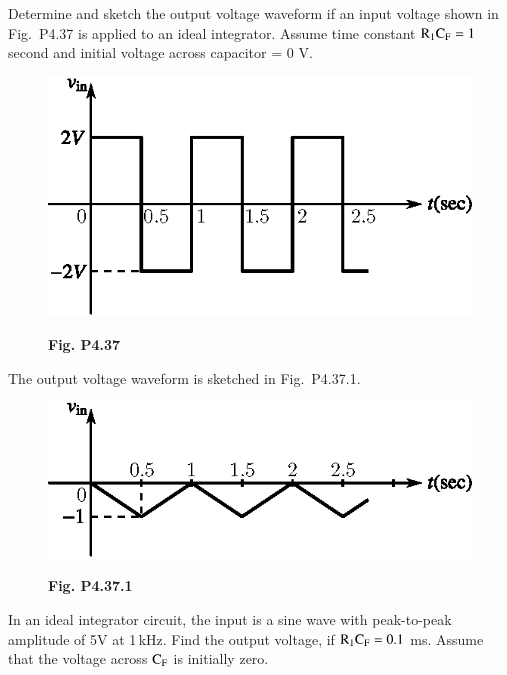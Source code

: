 \begin{problem}\label{prob4.37}
Determine and sketch the output voltage waveform if an input voltage shown in Fig.~P4.37 is applied to an ideal integrator. Assume time constant $\textrm{R}_{1}\textrm{C}_{\textrm{F}}=1$ second and initial voltage across capacitor = 0 V.
\begin{figure}[H]
\centering
\includegraphics{chap4/figP4.36.eps}

\smallskip
{\bf Fig. P4.37}
\end{figure}
\end{problem}

\begin{solution}
The output voltage waveform is sketched in Fig.~P4.37.1.
\begin{figure}[H]
\centering
\includegraphics{chap4/figP4.36.1.eps}

\smallskip
{\bf Fig. P4.37.1}
\end{figure}
\end{solution}

\begin{problem}\label{prob4.38}
In an ideal integrator circuit, the input is a sine wave with peak-to-peak amplitude of 5V at 1\,kHz. Find the output voltage, if $\textrm{R}_{1}\textrm{C}_{\textrm{F}}=0.1$ ms. Assume that the voltage across $\textrm{C}_{\textrm{F}}$ is initially zero.
\end{problem}

